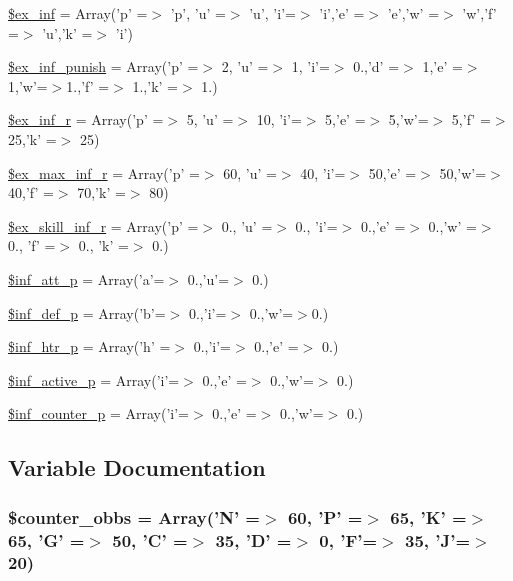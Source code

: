 \begin{DoxyCompactItemize}
\item 
\hyperlink{combatcfg__1_8php_a74c8d5942be03934eeb8801ec6cfc727}{\$ex\+\_\+inf} = Array('p' =$>$ 'p', 'u' =$>$ 'u', 'i'=$>$ 'i','e' =$>$ 'e','w' =$>$ 'w','f' =$>$ 'u','k' =$>$ 'i')
\item 
\hyperlink{combatcfg__1_8php_ac8f55d376b621b701cb57380cea7f37b}{\$ex\+\_\+inf\+\_\+punish} = Array('p' =$>$ 2, 'u' =$>$ 1, 'i'=$>$ 0.,'d' =$>$ 1,'e' =$>$ 1,'w'=$>$1.,'f' =$>$ 1.,'k' =$>$ 1.)
\item 
\hyperlink{combatcfg__1_8php_a35df3cfaaef964eda483dcd735ed3f01}{\$ex\+\_\+inf\+\_\+r} = Array('p' =$>$ 5, 'u' =$>$ 10, 'i'=$>$ 5,'e' =$>$ 5,'w'=$>$ 5,'f' =$>$ 25,'k' =$>$ 25)
\item 
\hyperlink{combatcfg__1_8php_a5d883df69e92e48c5216428a88964239}{\$ex\+\_\+max\+\_\+inf\+\_\+r} = Array('p' =$>$ 60, 'u' =$>$ 40, 'i'=$>$ 50,'e' =$>$ 50,'w'=$>$ 40,'f' =$>$ 70,'k' =$>$ 80)
\item 
\hyperlink{combatcfg__1_8php_a42c06eefc7604593c5655352e79c89c4}{\$ex\+\_\+skill\+\_\+inf\+\_\+r} = Array('p' =$>$ 0., 'u' =$>$ 0., 'i'=$>$ 0.,'e' =$>$ 0.,'w' =$>$ 0., 'f' =$>$ 0., 'k' =$>$ 0.)
\item 
\hyperlink{combatcfg__1_8php_a97dc28fdb2fa0a86e0fe7d50cf172f2d}{\$inf\+\_\+att\+\_\+p} = Array('a'=$>$ 0.,'u'=$>$ 0.)
\item 
\hyperlink{combatcfg__1_8php_a3475395c844150e292d03a69619f78bc}{\$inf\+\_\+def\+\_\+p} = Array('b'=$>$ 0.,'i'=$>$ 0.,'w'=$>$0.)
\item 
\hyperlink{combatcfg__1_8php_adad1350ad8f9f69dfd978f5b3e750463}{\$inf\+\_\+htr\+\_\+p} = Array('h' =$>$ 0.,'i'=$>$ 0.,'e' =$>$ 0.)
\item 
\hyperlink{combatcfg__1_8php_a393d73e9a6ca563f564d042637767a7f}{\$inf\+\_\+active\+\_\+p} = Array('i'=$>$ 0.,'e' =$>$ 0.,'w'=$>$ 0.)
\item 
\hyperlink{combatcfg__1_8php_a80479ba7a8968afdd20f8b71990de73c}{\$inf\+\_\+counter\+\_\+p} = Array('i'=$>$ 0.,'e' =$>$ 0.,'w'=$>$ 0.)
\end{DoxyCompactItemize}


\subsection{Variable Documentation}
\hypertarget{combatcfg__1_8php_a81eebe5aca6408cce5219624c52f7f86}{
\subsubsection[{\$counter\+\_\+obbs}]{\setlength{\rightskip}{0pt plus 5cm}\$counter\+\_\+obbs = Array('N' =$>$ 60, 'P' =$>$ 65, 'K' =$>$ 65, 'G' =$>$ 50, 'C' =$>$ 35, 'D' =$>$ 0, 'F'=$>$ 35, 'J'=$>$ 20)}}\label{combatcfg__1_8php_a81eebe5aca6408cce5219624c52f7f86}


